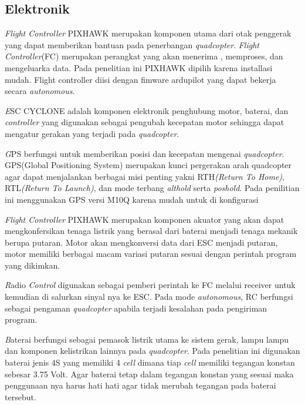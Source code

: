 \subsection{Elektronik}
\begin{packed_item}
	\item [1.]\textit{Flight Controller} PIXHAWK
	merupakan komponen utama dari otak penggerak yang dapat memberikan bantuan pada penerbangan \textit{quadcopter}. \textit{Flight Controller}(FC) merupakan perangkat yang akan menerima , memproses, dan mengeluarka data. Pada penelitian ini PIXHAWK dipilih karena installasi mudah. Flight controller diisi dengan fimware ardupilot yang dapat bekerja secara \textit{autonomous}.
	\item [2.]\textit ESC CYCLONE
	adalah komponen elektronik penghubung motor, baterai, dan \textit{controller} yang digunakan sebagai pengubah kecepatan motor sehingga dapat mengatur gerakan yang terjadi pada \textit{quadcopter}.
	\item [3.]\textit GPS
	berfungsi untuk memberikan posisi dan kecepatan mengenai \textit{quadcopter}. GPS(Global Positioning System) merupakan kunci pergerakan arah quadcopter agar dapat menjalankan berbagai misi penting yakni RTH\textit{(Return To Home)}, RTL\textit{(Return To Launch)}, dan mode terbang \textit{althold} serta \textit{poshold}. Pada penilitian ini menggunakan GPS versi M10Q karena mudah untuk di konfigurasi
	\item [4.]\textit{Flight Controller} PIXHAWK
	merupakan komponen akuator yang akan dapat mengkonfersikan tenaga listrik yang berasal dari baterai menjadi tenaga mekanik berupa putaran. Motor akan mengkonversi data dari ESC menjadi putaran, motor memiliki berbagai macam variasi putaran sesuai dengan perintah program yang dikimkan.
	\item [5.]\textit Radio \textit{Control}
	digunakan sebagai pemberi perintah ke FC melalui receiver untuk kemudian di salurkan sinyal nya ke ESC. Pada mode \textit{autonomous}, RC berfungsi sebagai pengaman \textit{quadcopter} apabila terjadi kesalahan pada pengiriman program.
	\item [6.]\textit Baterai
	berfungsi sebagai pemasok listrik utama ke sistem gerak, lampu lampu dan komponen kelistrikan lainnya pada \textit{quadcopter}. Pada penelitian ini digunakan baterai jenis 4S yang memiliki 4 \textit{cell} dimana tiap \textit{cell} memiliki tegangan konstan sebesar 3.75 Volt. Agar baterai tetap dalam tegangan konstan yang sesuai maka penggunaan nya harus hati hati agar tidak merubah tegangan pada baterai tersebut.

\end{packed_item}
